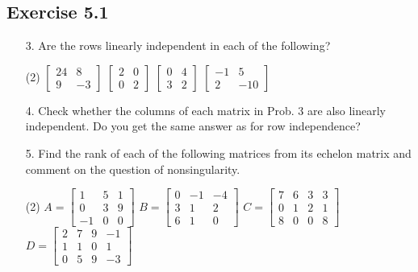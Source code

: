 \documentclass{./../../Latex/homework}
\begin{document}
\thispagestyle{plain}

\subsection*{Exercise 5.1}

\begin{enumerate}

\item[3.] Are the rows linearly independent in each of the following?
\begin{tasks}(2)
	\task $\left[\begin{array}{rr}24 & 8 \\ 9 & -3\end{array}\right]$
	\task $\left[\begin{array}{ll}2 & 0 \\ 0 & 2\end{array}\right]$
	\task $\left[\begin{array}{ll}0 & 4 \\ 3 & 2\end{array}\right]$
	\task $\left[\begin{array}{rr}-1 & 5 \\ 2 & -10\end{array}\right]$
\end{tasks}

\item[4.] Check whether the columns of each matrix in Prob. 3 are also linearly independent. Do you get the same answer as for row independence?

\item[5.] Find the rank of each of the following matrices from its echelon matrix and comment on the question of nonsingularity.
\begin{tasks}(2)
\task $A=\left[\begin{array}{rrr}1 & 5 & 1 \\ 0 & 3 & 9 \\ -1 & 0 & 0\end{array}\right]$
\task $B=\left[\begin{array}{rrr}0 & -1 & -4 \\ 3 & 1 & 2 \\ 6 & 1 & 0\end{array}\right]$
\task $C=\left[\begin{array}{llll}7 & 6 & 3 & 3 \\ 0 & 1 & 2 & 1 \\ 8 & 0 & 0 & 8\end{array}\right]$
\task $D=\left[\begin{array}{rrrr}2 & 7 & 9 & -1 \\ 1 & 1 & 0 & 1 \\ 0 & 5 & 9 & -3\end{array}\right]$
\end{tasks}


\end{enumerate}
\end{document}

